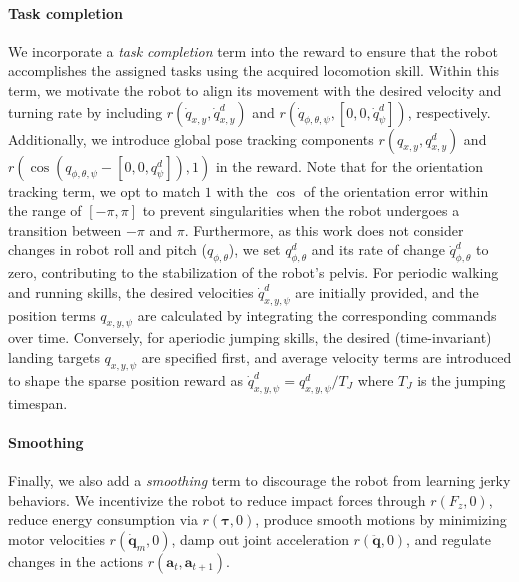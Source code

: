 \paragraph{Task completion}
We incorporate a \textit{task completion} term into the reward to ensure that the robot accomplishes the assigned tasks using the acquired locomotion skill. 
Within this term, we motivate the robot to align its movement with the desired velocity and turning rate by including $r(\dot{q}_{x,y}, \dot{q}^d_{x,y})$ and $r(\dot{q}_{\phi,\theta,\psi}, [0,0,\dot{q}^d_{\psi}])$, respectively. 
Additionally, we introduce global pose tracking components $r(q_{x,y}, q^d_{x,y})$ and $r(\cos(q_{\phi,\theta,\psi}-[0,0,q^d_{\psi}]),1)$ in the reward.
Note that for the orientation tracking term, we opt to match $1$ with the $\cos$ of the orientation error within the range of $[-\pi, \pi]$ to prevent singularities when the robot undergoes a transition between $-\pi$ and $\pi$. 
Furthermore, as this work does not consider changes in robot roll and pitch ($q_{\phi, \theta}$), we set $q^d_{\phi, \theta}$ and its rate of change $\dot{q}^d_{\phi, \theta}$ to zero, contributing to the stabilization of the robot's pelvis.
For periodic walking and running skills, the desired velocities $\dot{q}^d_{x,y,\psi}$ are initially provided, and the position terms $q_{x,y,\psi}$ are calculated by integrating the corresponding commands over time. 
Conversely, for aperiodic jumping skills, the desired (time-invariant) landing targets $q_{x,y,\psi}$ are specified first, and average velocity terms are introduced to shape the sparse position reward as $\dot{q}^d_{x,y,\psi}=q^d_{x,y,\psi}/T_J$ where $T_J$ is the jumping timespan.

\paragraph{Smoothing}
Finally, we also add a \textit{smoothing} term to discourage the robot from learning jerky behaviors.
We incentivize the robot to reduce impact forces through $r(F_z,0)$, reduce energy consumption via $r(\bm{\tau},0)$, produce smooth motions by minimizing motor velocities $r(\dot{\mathbf{q}}_m,0)$, damp out joint acceleration $r(\ddot{\mathbf{q}},0)$, and regulate changes in the actions $r(\mathbf{a}_t, \mathbf{a}_{t+1})$.



